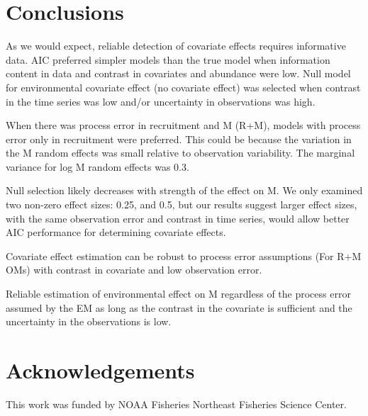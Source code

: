 \documentclass[
  12pt,
]{article}
\newlength{\cslhangindent}
\newlength{\cslentryspacingunit} %
\newenvironment{CSLReferences}[2] %
 {%
  \setlength{\parindent}{0pt}
  \ifodd #1
  \let\oldpar\par
  \def\par{\hangindent=\cslhangindent\oldpar}
  \fi
  \setlength{\parskip}{#2\cslentryspacingunit}
 }%
 {}
\begin{document}
\hypertarget{conclusions}{%
\section*{Conclusions}\label{conclusions}}

As we would expect, reliable detection of covariate effects requires
informative data. AIC preferred simpler models than the true model when
information content in data and contrast in covariates and abundance
were low. Null model for environmental covariate effect (no covariate
effect) was selected when contrast in the time series was low and/or
uncertainty in observations was high.

When there was process error in recruitment and M (R+M), models with
process error only in recruitment were preferred. This could be because
the variation in the M random effects was small relative to observation
variability. The marginal variance for log M random effects was 0.3.

Null selection likely decreases with strength of the effect on M. We
only examined two non-zero effect sizes: 0.25, and 0.5, but our results
suggest larger effect sizes, with the same observation error and
contrast in time series, would allow better AIC performance for
determining covariate effects.

Covariate effect estimation can be robust to process error assumptions
(For R+M OMs) with contrast in covariate and low observation error.

Reliable estimation of environmental effect on M regardless of the
process error assumed by the EM as long as the contrast in the covariate
is sufficient and the uncertainty in the observations is low.

\hypertarget{acknowledgements}{%
\section*{Acknowledgements}\label{acknowledgements}}

This work was funded by NOAA Fisheries Northeast Fisheries Science
Center.

\pagebreak



\hypertarget{refs}{}
\begin{CSLReferences}{0}{0}
\end{CSLReferences}

\pagebreak
\end{document}
